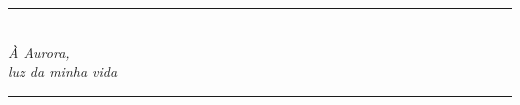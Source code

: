 \begin{titlingpage}
    
    \thispagestyle{empty}
        
    \vspace*{\fill}
   	\centering
   	\noindent
    \noindent\rule{5cm}{0.4pt}\\
    \vspace*{0.4cm}
    \large\textit{À Aurora,\\luz da minha vida}\\
    \noindent\rule{5cm}{0.4pt}
    \vspace*{\fill}
    
    \restoregeometry
    
\end{titlingpage}